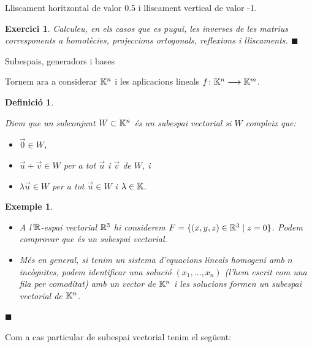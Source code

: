 \documentclass[
  11pt,
]{book}
\makeatletter
\numberwithin{dummy}{section}
\theoremstyle{maincolornumbox}
\newtheorem{exerciseT}{Exercici}[chapter]
\theoremstyle{blacknumex}
\newtheorem{exampleT}{Exemple}[chapter]
\theoremstyle{blacknumbox}
\newtheorem{definitionT}{Definició}[chapter]
\theoremstyle{maincolornum}
\newenvironment{exercise}{\begin{eBox}\begin{exerciseT}}{\hfill{\color{maincolor}\tiny\ensuremath{\blacksquare}}\end{exerciseT}\end{eBox}}
\newenvironment{definition}{\begin{dBox}\begin{definitionT}}{\end{definitionT}\end{dBox}}
\newenvironment{example}{\begin{exampleT}}{\hfill{\tiny\ensuremath{\blacksquare}}\end{exampleT}}
\renewcommand{\section}{\@startsection{section}{1}{\z@}
{-4ex \@plus -1ex \@minus -.4ex}
{1ex \@plus.2ex }
{\normalfont\large\sffamily\bfseries}}
\newlength\esp
\makeatother
\begin{document}
Lliscament horitzontal de valor {0.5} i lliscament vertical de valor {-1}.

\begin{exercise}
Calculeu, en els casos que es pugui, les inverses de les matrius
corresponents a homotècies, projeccions ortogonals, reflexions i
lliscaments.
\end{exercise}

\section{Subespais, generadors i bases}\label{subespais-generadors-i-bases}

Tornem ara a considerar \(\mathbb{K}^n\) i les aplicacions lineals
\(f\colon \mathbb{K}^n\longrightarrow\mathbb{K}^m\).

\begin{definition}
\protect\hypertarget{def:subespai}{}\label{def:subespai}

Diem que un subconjunt
\emph{\(W\subset \mathbb{K}^n\) és un subespai vectorial} si \(W\) compleix que:

\begin{itemize}
\item
  \(\vec 0 \in W\),
\item
  \(\vec u+\vec v \in W\) per a tot \(\vec u\) i \(\vec v\) de \(W\), i
\item
  \(\lambda \vec u\in W\) per a tot \(\vec u\in W\) i \(\lambda\in\mathbb{K}\).
\end{itemize}

\end{definition}

\begin{example}
\leavevmode

\begin{itemize}
\item
  A l'\(\mathbb{R}\)-espai vectorial \(\mathbb{R}^3\) hi considerem
  \(F=\{(x,y,z) \in \mathbb{R}^3 \mid z=0\}\). Podem comprovar que és un
  subespai vectorial.
\item
  Més en general, si tenim un sistema d'equacions lineals homogeni amb
  \(n\) incògnites, podem identificar una solució \((x_1,\dots,x_n)\)
  (l'hem escrit com una fila per comoditat) amb un vector de \(\mathbb{K}^n\) i
  les solucions formen un subespai vectorial de \(\mathbb{K}^n\).
\end{itemize}

\end{example}

Com a cas particular de subespai vectorial tenim el següent:
\end{document}
